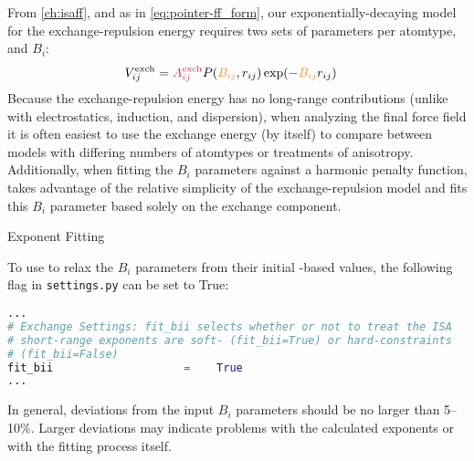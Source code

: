 From \cref{ch:isaff}, and as in \cref{eq:pointer-ff_form},
our exponentially-decaying model for the exchange-repulsion energy 
requires two sets of parameters per atomtype,  and $B_i$: 
%
\newcommand{\bij}{\textcolor{cfit}{B_{ij}}}
\newcommand{\bijr}{\bij r}
\begin{align}
\vrep_{ij} &= \textcolor{fit}{\Aex{ij}} P(\bij, r_{ij}) \exp(-\bijr_{ij})
\end{align}
%
Because the exchange-repulsion energy has no long-range contributions (unlike
with electrostatics, induction, and dispersion), when analyzing the final
force field it is often easiest to use the exchange energy (by itself) to
compare between models with differing numbers of atomtypes or treatments of
anisotropy. Additionally, when fitting the $B_i$ parameters against a harmonic
penalty function, \pointer takes advantage of the relative simplicity of the
exchange-repulsion model and fits this $B_i$ parameter based solely on the
exchange component.

\begin{paragraph}{Exponent Fitting}

To use \pointer to relax the $B_i$ parameters from their initial \isa-based values, the
following flag in \verb|settings.py| can be set to True:

\begin{lstlisting}[language=python]
...
# Exchange Settings: fit_bii selects whether or not to treat the ISA
# short-range exponents are soft- (fit_bii=True) or hard-constraints
# (fit_bii=False)
fit_bii                    =    True
...
\end{lstlisting}
In general, deviations from the input $B_i$ parameters should be no larger
than 5--10\%. Larger deviations may indicate problems with the calculated \bsisa
exponents or with the fitting process itself.

\end{paragraph}
